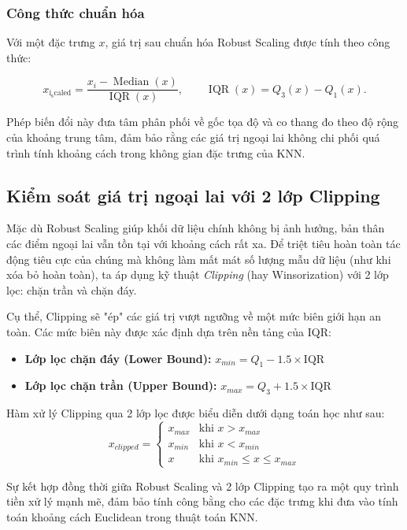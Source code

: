 \documentclass[12pt,a4paper]{article}
\begin{document}
\subsubsection*{Công thức chuẩn hóa}

Với một đặc trưng $x$, giá trị sau chuẩn hóa Robust Scaling được tính
theo công thức:

\begin{equation}
    x_{\mathrm{i_scaled}} = \frac{x_i - \operatorname{Median}(x)}{\operatorname{IQR}(x)},
    \qquad \operatorname{IQR}(x) = Q_3(x) - Q_1(x).
\end{equation}

Phép biến đổi này đưa tâm phân phối về gốc tọa độ và co thang đo
theo độ rộng của khoảng trung tâm, đảm bảo rằng các giá trị ngoại
lai không chi phối quá trình tính khoảng cách trong không gian đặc
trưng của KNN.
\subsection{Kiểm soát giá trị ngoại lai với 2 lớp Clipping}
Mặc dù Robust Scaling giúp khối dữ liệu chính không bị ảnh hưởng, bản thân các điểm ngoại lai vẫn tồn tại với khoảng cách rất xa. Để triệt tiêu hoàn toàn tác động tiêu cực của chúng mà không làm mất mát số lượng mẫu dữ liệu (như khi xóa bỏ hoàn toàn), ta áp dụng kỹ thuật \textit{Clipping} (hay Winsorization) với 2 lớp lọc: chặn trần và chặn đáy.

Cụ thể, Clipping sẽ "ép" các giá trị vượt ngưỡng về một mức biên giới hạn an toàn. Các mức biên này được xác định dựa trên nền tảng của IQR:
\begin{itemize}
    \item \textbf{Lớp lọc chặn đáy (Lower Bound):} $x_{min} = Q_1 - 1.5 \times \text{IQR}$
    \item \textbf{Lớp lọc chặn trần (Upper Bound):} $x_{max} = Q_3 + 1.5 \times \text{IQR}$
\end{itemize}

Hàm xử lý Clipping qua 2 lớp lọc được biểu diễn dưới dạng toán học như sau:
$$
x_{clipped} = 
\begin{cases} 
x_{max} & \text{khi } x > x_{max} \\
x_{min} & \text{khi } x < x_{min} \\
x & \text{khi } x_{min} \le x \le x_{max}
\end{cases}
$$

Sự kết hợp đồng thời giữa Robust Scaling và 2 lớp Clipping tạo ra một quy trình tiền xử lý mạnh mẽ, đảm bảo tính công bằng cho các đặc trưng khi đưa vào tính toán khoảng cách Euclidean trong thuật toán KNN.
\end{document}
